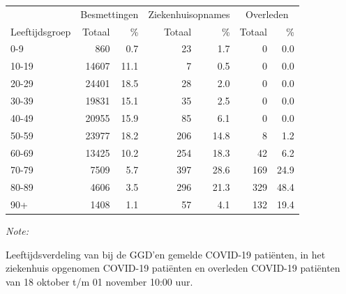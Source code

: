 \documentclass[
  english,
  man,floatsintext]{apa6}
\begin{document}
\begin{table}[H]
\centering\begingroup\fontsize{11}{13}\selectfont

\begin{threeparttable}
\begin{tabular}{lrrrrrr}
\toprule
\multicolumn{1}{c}{ } & \multicolumn{2}{c}{Besmettingen} & \multicolumn{2}{c}{Ziekenhuisopnames} & \multicolumn{2}{c}{Overleden} \\
\cmidrule(l{3pt}r{3pt}){2-3} \cmidrule(l{3pt}r{3pt}){4-5} \cmidrule(l{3pt}r{3pt}){6-7}
Leeftijdsgroep & Totaal & \% & Totaal & \% & Totaal & \%\\
\midrule
0-9 & 860 & 0.7 & 23 & 1.7 & 0 & 0.0\\
10-19 & 14607 & 11.1 & 7 & 0.5 & 0 & 0.0\\
20-29 & 24401 & 18.5 & 28 & 2.0 & 0 & 0.0\\
30-39 & 19831 & 15.1 & 35 & 2.5 & 0 & 0.0\\
40-49 & 20955 & 15.9 & 85 & 6.1 & 0 & 0.0\\
50-59 & 23977 & 18.2 & 206 & 14.8 & 8 & 1.2\\
60-69 & 13425 & 10.2 & 254 & 18.3 & 42 & 6.2\\
70-79 & 7509 & 5.7 & 397 & 28.6 & 169 & 24.9\\
80-89 & 4606 & 3.5 & 296 & 21.3 & 329 & 48.4\\
90+ & 1408 & 1.1 & 57 & 4.1 & 132 & 19.4\\
\bottomrule
\end{tabular}
\begin{tablenotes}
\item \textit{Note: } 
\item Leeftijdsverdeling van bij de GGD’en gemelde COVID-19 patiënten, in het ziekenhuis opgenomen COVID-19 patiënten en overleden COVID-19 patiënten van 18 oktober t/m 01 november 10:00 uur.
\end{tablenotes}
\end{threeparttable}
\endgroup{}
\end{table}
\end{document}
